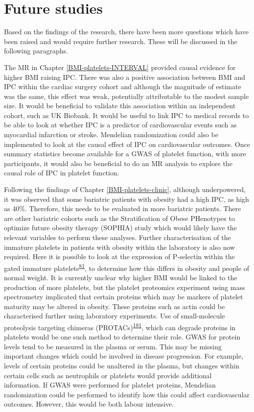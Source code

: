 \documentclass[11pt,twoside]{bristolthesis}
\begin{document}
\hypertarget{future-studies}{%
\section{Future studies}\label{future-studies}}

Based on the findings of the research, there have been more questions which have been raised and would require further research. These will be discussed in the following paragraphs.

The MR in Chapter \ref{BMI-platelets-INTERVAL} provided causal evidence for higher BMI raising IPC. There was also a positive association between BMI and IPC within the cardiac surgery cohort and although the magnitude of estimate was the same, this effect was weak, potentially attributable to the modest sample size. It would be beneficial to validate this association within an independent cohort, such as UK Biobank. It would be useful to link IPC to medical records to be able to look at whether IPC is a predictor of cardiovascular events such as myocardial infarction or stroke. Mendelian randomization could also be implemented to look at the causal effect of IPC on cardiovascular outcomes. Once summary statistics become available for a GWAS of platelet function, with more participants, it would also be beneficial to do an MR analysis to explore the causal role of IPC in platelet function.

Following the findings of Chapter \ref{BMI-platelets-clinic}, although underpowered, it was observed that some bariatric patients with obesity had a high IPC, as high as 40\%. Therefore, this needs to be evaluated in more bariatric patients. There are other bariatric cohorts such as the Stratification of Obese PHenotypes to optimize future obesity therapy (SOPHIA) study which would likely have the relevant variables to perform these analyses. Further characterisation of the immature platelets in patients with obesity within the laboratory is also now required. Here it is possible to look at the expression of P-selectin within the gated immature platelets\textsuperscript{\protect\hyperlink{ref-Bernlochner2015a}{81}}, to determine how this differs in obesity and people of normal weight. It is currently unclear why higher BMI would be linked to the production of more platelets, but the platelet proteomics experiment using mass spectrometry implicated that certain proteins which may be markers of platelet maturity may be altered in obesity. These proteins such as actin could be characterised further using laboratory experiments. Use of small-molecule proteolysis targeting chimeras (PROTACs)\textsuperscript{\protect\hyperlink{ref-Sledz2020}{181}}, which can degrade proteins in platelets would be one such method to determine their role. GWAS for protein levels tend to be measured in the plasma or serum. This may be missing important changes which could be involved in disease progression. For example, levels of certain proteins could be unaltered in the plasma, but changes within certain cells such as neutrophils or platelets would provide additional information. If GWAS were performed for platelet proteins, Mendelian randomization could be performed to identify how this could affect cardiovascular outcomes. However, this would be both labour intensive.
\end{document}
